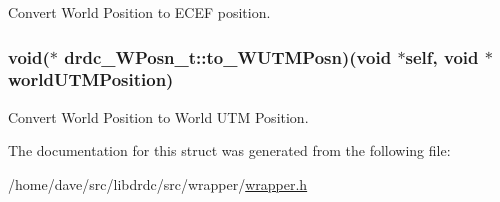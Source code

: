 Convert World Position to ECEF position. 

\hypertarget{structdrdc__WPosn__t_68bd9dd868af662b51976bd7a6c50aa3}{
\subsubsection[to\_\-WUTMPosn]{\setlength{\rightskip}{0pt plus 5cm}void($\ast$ {\bf drdc\_\-WPosn\_\-t::to\_\-WUTMPosn})(void $\ast$self, void $\ast$worldUTMPosition)}}
\label{structdrdc__WPosn__t_68bd9dd868af662b51976bd7a6c50aa3}


Convert World Position to World UTM Position. 



The documentation for this struct was generated from the following file:\begin{CompactItemize}
\item 
/home/dave/src/libdrdc/src/wrapper/\hyperlink{wrapper_8h}{wrapper.h}\end{CompactItemize}
